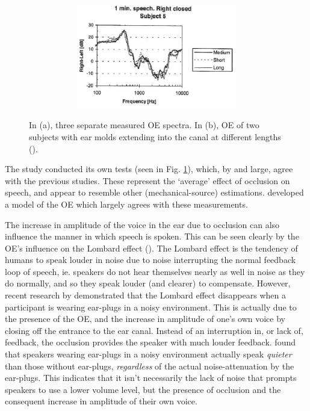 \begin{figure}
\begin{subfigure}{0.5\textwidth}
\begin{subfigure}{0.8\textwidth}
  \end{subfigure}
  \begin{subfigure}{0.8\textwidth}
    \centering
    \includegraphics[width=1\textwidth]{figure/Hansen_OE-plot_b.png}
  \end{subfigure}
  \caption{ }
  \label{fig:hansenAverageOEb}
\end{subfigure}
\caption{In (a), three separate measured OE spectra. In (b), OE of two subjects with ear molds extending into the canal at different lengths (\cite{hansen:97b}).}
\label{fig:hansenAverageOE}
\end{figure}
%
The study conducted its own tests (seen in Fig. \ref{fig:hansenAverageOEb}), which, by and large, agree with the previous studies.  
These represent the `average' effect of occlusion on speech, and appear to resemble other (mechanical-source) estimations.  \cite{hansen:97b} developed a model of the OE which largely agrees with these measurements.

The increase in amplitude of the voice in the ear due to occlusion can also influence the manner in which speech is spoken.  This can be seen clearly by the OE's influence on the Lombard effect (\cite{lombard:11,lane:71}).  The Lombard effect is the tendency of humans to speak louder in noise due to noise interrupting the normal feedback loop of speech, ie. speakers do not hear themselves nearly as well in noise as they do normally, and so they speak louder (and clearer) to compensate.  However, recent research by \cite{brungart:12} demonstrated that the Lombard effect disappears when a participant is wearing ear-plugs in a noisy environment.  This is actually due to the presence of the OE, and the increase in amplitude of one's own voice by closing off the entrance to the ear canal.  Instead of an interruption in, or lack of, feedback, the occlusion provides the speaker with much louder feedback.  \cite{brungart:12} found that speakers wearing ear-plugs in a noisy environment actually speak \textit{quieter} than those without ear-plugs, \textit{regardless} of the actual noise-attenuation by the ear-plugs.  This indicates that it isn't necessarily the lack of noise that prompts speakers to use a lower volume level, but the presence of occlusion and the consequent increase in amplitude of their own voice.

